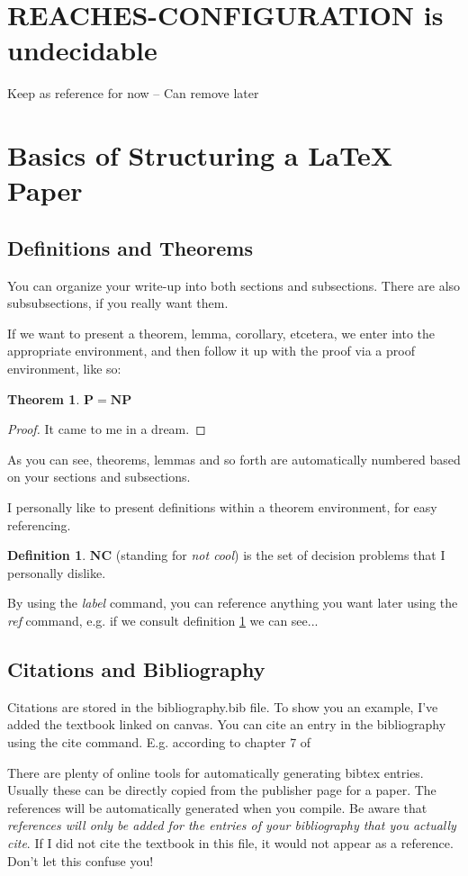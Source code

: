 \documentclass{article}
\theoremstyle{definition}
\newtheorem{definition}{Definition}[section]
\theoremstyle{plain}
\theoremstyle{plain}
\newtheorem{theorem}{Theorem}[section]
\begin{document}
\section{REACHES-CONFIGURATION is undecidable}

 Keep as reference for now -- Can remove later
\section{Basics of Structuring a LaTeX Paper}

\subsection{Definitions and Theorems}
You can organize your write-up into both sections and subsections. There are also subsubsections, if you really want them. 

If we want to present a theorem, lemma, corollary, etcetera, we enter into the appropriate environment, and then follow it up with the proof via a proof environment, like so:

\begin{theorem}
    $\mathbf{P} = \mathbf{NP}$
\end{theorem}

\begin{proof}
    It came to me in a dream.
\end{proof}

As you can see, theorems, lemmas and so forth are automatically numbered based on your sections and subsections. 

I personally like to present definitions within a theorem environment, for easy referencing.
\begin{definition}\label{NC}
    $\mathbf{NC}$ (standing for \emph{not cool}) is the set of decision problems that I personally dislike. 
\end{definition}

By using the \emph{label} command, you can reference anything you want later using the \emph{ref} command, e.g. if we consult definition \ref{NC} we can see...

\subsection{Citations and Bibliography}

Citations are stored in the bibliography.bib file. To show you an example, I've added the textbook linked on canvas. You can cite an entry in the bibliography using the cite command. E.g. according to chapter 7 of 

There are plenty of online tools for automatically generating bibtex entries. Usually these can be directly copied from the publisher page for a paper. The references will be automatically generated when you compile. Be aware that \emph{references will only be added for the entries of your bibliography that you actually cite}. If I did not cite the textbook in this file, it would not appear as a reference. Don't let this confuse you!
\printbibliography
\end{document}
